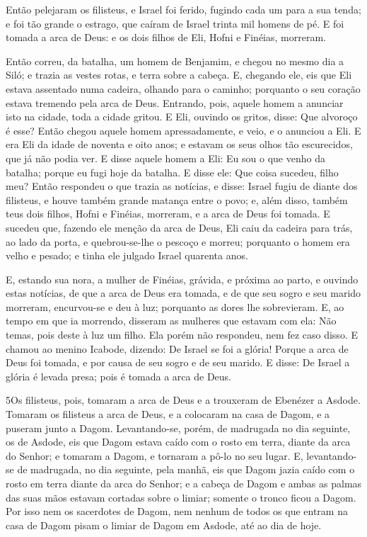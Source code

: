 Então pelejaram os filisteus, e Israel foi ferido, fugindo cada
um para a sua tenda; e foi tão grande o estrago, que caíram de
Israel trinta mil homens de pé. E foi tomada a arca de Deus:
e os dois filhos de Eli, Hofni e Finéias, morreram.

Então correu, da batalha, um homem de Benjamim, e chegou no mesmo
dia a Siló; e trazia as vestes rotas, e terra sobre a cabeça.
E, chegando ele, eis que Eli estava assentado numa cadeira,
olhando para o caminho; porquanto o seu coração estava tremendo pela
arca de Deus. Entrando, pois, aquele homem a anunciar isto na
cidade, toda a cidade gritou. E Eli, ouvindo os gritos,
disse: Que alvoroço é esse? Então chegou aquele homem
apressadamente, e veio, e o anunciou a Eli. E era Eli da
idade de noventa e oito anos; e estavam os seus olhos tão
escurecidos, que já não podia ver. E disse aquele homem a
Eli: Eu sou o que venho da batalha; porque eu fugi hoje da batalha.
E disse ele: Que coisa sucedeu, filho meu? Então respondeu o
que trazia as notícias, e disse: Israel fugiu de diante dos
filisteus, e houve também grande matança entre o povo; e, além
disso, também teus dois filhos, Hofni e Finéias, morreram, e a arca
de Deus foi tomada. E sucedeu que, fazendo ele menção da arca
de Deus, Eli caiu da cadeira para trás, ao lado da porta, e
quebrou-se-lhe o pescoço e morreu; porquanto o homem era velho e
pesado; e tinha ele julgado Israel quarenta anos.

E, estando sua nora, a mulher de Finéias, grávida, e próxima ao
parto, e ouvindo estas notícias, de que a arca de Deus era tomada, e
de que seu sogro e seu marido morreram, encurvou-se e deu à luz;
porquanto as dores lhe sobrevieram. E, ao tempo em que ia
morrendo, disseram as mulheres que estavam com ela: Não temas, pois
deste à luz um filho. Ela porém não respondeu, nem fez caso disso.
E chamou ao menino Icabode, dizendo: De Israel se foi a
glória! Porque a arca de Deus foi tomada, e por causa de seu sogro e
de seu marido. E disse: De Israel a glória é levada presa;
pois é tomada a arca de Deus.

\medskip

\lettrine{5} Os filisteus, pois, tomaram a arca de Deus e a
trouxeram de Ebenézer a Asdode. Tomaram os filisteus a arca de
Deus, e a colocaram na casa de Dagom, e a puseram junto a Dagom.
Levantando-se, porém, de madrugada no dia seguinte, os de
Asdode, eis que Dagom estava caído com o rosto em terra, diante da
arca do Senhor; e tomaram a Dagom, e tornaram a pô-lo no seu lugar.
E, levantando-se de madrugada, no dia seguinte, pela manhã, eis
que Dagom jazia caído com o rosto em terra diante da arca do Senhor;
e a cabeça de Dagom e ambas as palmas das suas mãos estavam cortadas
sobre o limiar; somente o tronco ficou a Dagom. Por isso nem os
sacerdotes de Dagom, nem nenhum de todos os que entram na casa de
Dagom pisam o limiar de Dagom em Asdode, até ao dia de hoje.

